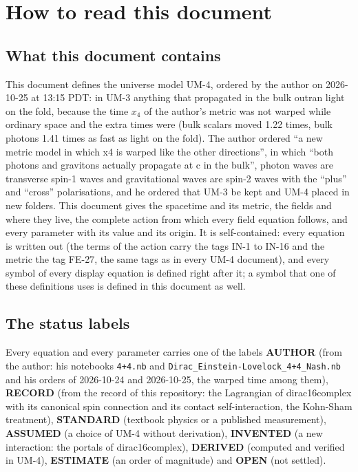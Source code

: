 \documentclass[
  10pt,
]{article}
\begin{document}
\hypertarget{how-to-read-this-document}{%
\section{How to read this document}\label{how-to-read-this-document}}

\hypertarget{what-this-document-contains}{%
\subsection{What this document
contains}\label{what-this-document-contains}}

This document defines the universe model UM-4, ordered by the author on
2026-10-25 at 13:15 PDT: in UM-3 anything that propagated in the bulk
outran light on the fold, because the time \(x_4\) of the author's
metric was not warped while ordinary space and the extra times were
(bulk scalars moved 1.22 times, bulk photons 1.41 times as fast as light
on the fold). The author ordered ``a new metric model in which x4 is
warped like the other directions'', in which ``both photons and
gravitons actually propagate at c in the bulk'', photon waves are
transverse spin-1 waves and gravitational waves are spin-2 waves with
the ``plus'' and ``cross'' polarisations, and he ordered that UM-3 be
kept and UM-4 placed in new folders. This document gives the spacetime
and its metric, the fields and where they live, the complete action from
which every field equation follows, and every parameter with its value
and its origin. It is self-contained: every equation is written out (the
terms of the action carry the tags IN-1 to IN-16 and the metric the tag
FE-27, the same tags as in every UM-4 document), and every symbol of
every display equation is defined right after it; a symbol that one of
these definitions uses is defined in this document as well.

\hypertarget{the-status-labels}{%
\subsection{The status labels}\label{the-status-labels}}

Every equation and every parameter carries one of the labels
\textbf{AUTHOR} (from the author: his notebooks \texttt{4+4.nb} and
\texttt{Dirac\_Einstein-Lovelock\_4+4\_Nash.nb} and his orders of
2026-10-24 and 2026-10-25, the warped time among them), \textbf{RECORD}
(from the record of this repository: the Lagrangian of dirac16complex
with its canonical spin connection and its contact self-interaction, the
Kohn-Sham treatment), \textbf{STANDARD} (textbook physics or a published
measurement), \textbf{ASSUMED} (a choice of UM-4 without derivation),
\textbf{INVENTED} (a new interaction: the portals of dirac16complex),
\textbf{DERIVED} (computed and verified in UM-4), \textbf{ESTIMATE} (an
order of magnitude) and \textbf{OPEN} (not settled).
\end{document}
